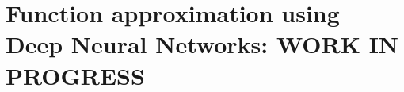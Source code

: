 \newpage
\chapter{Function approximation using Deep Neural Networks: WORK IN PROGRESS}\label{chap:neural_networks}